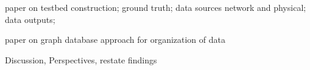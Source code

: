 \documentclass[english]{spimubphdthesis}
\begin{document}
paper on testbed construction; ground truth; data sources network and physical; data outputs; 

paper on graph database approach for organization of data

Discussion, Perspectives, restate findings


%
%
%
%
%
%
\end{document}
